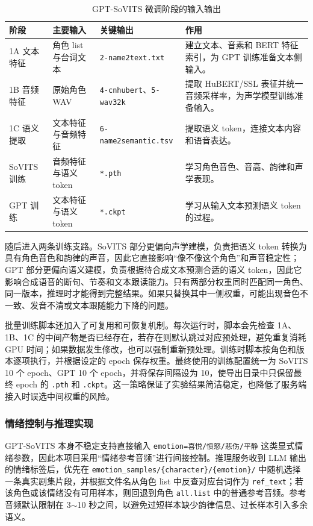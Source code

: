 \documentclass[12pt,a4paper]{article}
\begin{document}
\begin{table}[H]
\centering
\caption{GPT-SoVITS 微调阶段的输入输出}
\label{tab:gptsovits-train-io}
\begin{tabularx}{\textwidth}{p{2.3cm}p{2.8cm}p{4.3cm}X}
\toprule
\rowcolor{Bmid!18}
\textbf{阶段} & \textbf{主要输入} & \textbf{关键输出} & \textbf{作用} \\
\midrule
\rowcolor{Blight}
1A 文本特征 & 角色 list 与台词文本 & \texttt{2-name2text.txt} & 建立文本、音素和 BERT 特征索引，为 GPT 训练准备文本侧输入。 \\
\rowcolor{white}
1B 音频特征 & 原始角色 WAV & \texttt{4-cnhubert}、\texttt{5-wav32k} & 提取 HuBERT/SSL 表征并统一音频采样率，为声学模型训练准备输入。 \\
\rowcolor{Blight}
1C 语义提取 & 文本特征与音频特征 & \texttt{6-name2semantic.tsv} & 提取语义 token，连接文本内容和语音表达。 \\
\rowcolor{white}
SoVITS 训练 & 音频特征与语义 token & \texttt{*.pth} & 学习角色音色、音高、韵律和声学表现。 \\
\rowcolor{Blight}
GPT 训练 & 文本特征与语义 token & \texttt{*.ckpt} & 学习从输入文本预测语义 token 的过程。 \\
\bottomrule
\end{tabularx}
\end{table}

随后进入两条训练支路。SoVITS 部分更偏向声学建模，负责把语义 token 转换为具有角色音色和韵律的声音，因此它直接影响“像不像这个角色”和声音稳定性；GPT 部分更偏向语义建模，负责根据待合成文本预测合适的语义 token，因此它影响合成语音的断句、节奏和文本跟读能力。只有两部分权重同时匹配同一角色、同一版本，推理时才能得到完整结果。如果只替换其中一侧权重，可能出现音色不一致、发音不清或文本跟随能力下降的问题。

批量训练脚本还加入了可复用和可恢复机制。每次运行时，脚本会先检查 1A、1B、1C 的中间产物是否已经存在，若存在则默认跳过对应预处理，避免重复消耗 GPU 时间；如果数据发生修改，也可以强制重新预处理。训练时脚本按角色和版本逐项执行，并根据设定的 epoch 保存权重。最终使用的训练配置统一为 SoVITS 10 个 epoch、GPT 10 个 epoch，并将保存间隔设为 10，使导出目录中只保留最终 epoch 的 \texttt{.pth} 和 \texttt{.ckpt}。这一策略保证了实验结果简洁稳定，也降低了服务端接入时误选中间权重的风险。

\subsubsection{情绪控制与推理实现}

GPT-SoVITS 本身不稳定支持直接输入 \texttt{emotion=喜悦/愤怒/悲伤/平静} 这类显式情绪参数，因此本项目采用“情绪参考音频”进行间接控制。推理服务收到 LLM 输出的情绪标签后，优先在 \texttt{emotion\_samples/\{character\}/\{emotion\}/} 中随机选择一条真实剧集片段，并根据文件名从角色 list 中反查对应台词作为 \texttt{ref\_text}；若该角色或该情绪没有可用样本，则回退到角色 \texttt{all.list} 中的普通参考音频。参考音频默认限制在 3$\sim$10 秒之间，以避免过短样本缺少韵律信息、过长样本引入多余语义。
\end{document}
